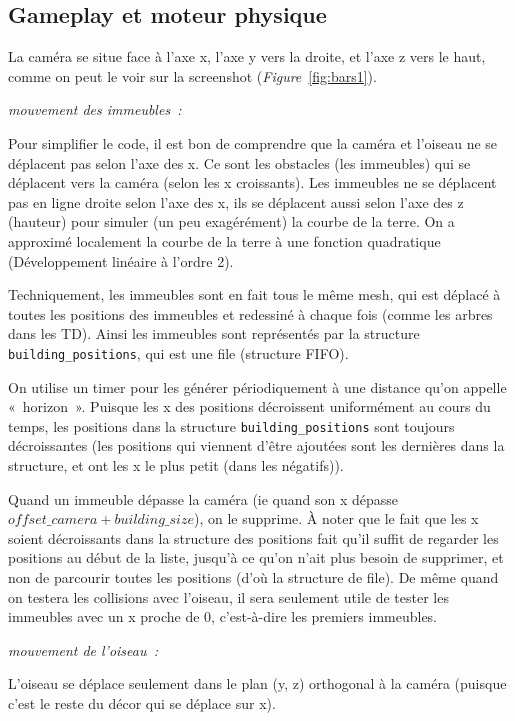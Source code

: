 \documentclass[a4paper,12pt]{article}
\newcommand{\cffig}[1]{(\textit{Figure} \ref{#1})}
\begin{document}
\subsection{Gameplay et moteur physique}

La caméra se situe face à l’axe x, l’axe y vers la droite, et l’axe z vers le haut, comme on peut le voir sur la screenshot \cffig{fig:bars1}.


\textit{mouvement des immeubles :}

Pour simplifier le code, il est bon de comprendre que la caméra et l’oiseau ne se déplacent pas selon l’axe des x. Ce sont les obstacles (les immeubles) qui se déplacent vers la caméra (selon les x croissants).
Les immeubles ne se déplacent pas en ligne droite selon l’axe des x, ils se déplacent aussi selon l’axe des z (hauteur) pour simuler (un peu exagérément) la courbe de la terre. On a approximé localement la courbe de la terre à une fonction quadratique (Développement linéaire à l’ordre 2). 

Techniquement, les immeubles sont en fait tous le même mesh, qui est déplacé à toutes les positions des immeubles et redessiné à chaque fois (comme les arbres dans les TD). Ainsi les immeubles sont représentés par la structure \verb|building_positions|, qui est une file (structure FIFO).

On utilise un timer pour les générer périodiquement à une distance qu’on appelle « horizon ». Puisque les x des positions décroissent uniformément au cours du temps, les positions dans la structure \verb|building_positions| sont toujours décroissantes (les positions qui viennent d’être ajoutées sont les dernières dans la structure, et ont les x le plus petit (dans les négatifs)).

Quand un immeuble dépasse la caméra (ie quand son x dépasse $offset\_camera + building\_size$), on le supprime. À noter que le fait que les x soient décroissants dans la structure des positions fait qu’il suffit de regarder les positions au début de la liste, jusqu’à ce qu’on n’ait plus besoin de supprimer, et non de parcourir toutes les positions (d’où la structure de file).
De même quand on testera les collisions avec l’oiseau, il sera seulement utile de tester les immeubles avec un x proche de 0, c’est-à-dire les premiers immeubles.

\textit{mouvement de l’oiseau :}

L’oiseau se déplace seulement dans le plan (y, z) orthogonal à la caméra (puisque c’est le reste du décor qui se déplace sur x).
\end{document}
